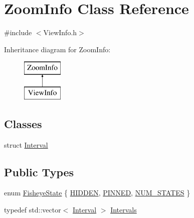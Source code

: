 \hypertarget{class_zoom_info}{}\section{Zoom\+Info Class Reference}
\label{class_zoom_info}


{\ttfamily \#include $<$View\+Info.\+h$>$}

Inheritance diagram for Zoom\+Info\+:\begin{figure}[H]
\begin{center}
\leavevmode
\includegraphics[height=2.000000cm]{class_zoom_info}
\end{center}
\end{figure}
\subsection*{Classes}
\begin{DoxyCompactItemize}
\item 
struct \hyperlink{struct_zoom_info_1_1_interval}{Interval}
\end{DoxyCompactItemize}
\subsection*{Public Types}
\begin{DoxyCompactItemize}
\item 
enum \hyperlink{class_zoom_info_a21e3cd944a2c0241db3c32b2416ba7b6}{Fisheye\+State} \{ \hyperlink{class_zoom_info_a21e3cd944a2c0241db3c32b2416ba7b6aac88e9f498c9306c26caffbeaa349a8e}{H\+I\+D\+D\+EN}, 
\hyperlink{class_zoom_info_a21e3cd944a2c0241db3c32b2416ba7b6a228bf420294e19bf80dcc9320efa2c9b}{P\+I\+N\+N\+ED}, 
\hyperlink{class_zoom_info_a21e3cd944a2c0241db3c32b2416ba7b6ae316d00299b7364f4162fe9f4660c42e}{N\+U\+M\+\_\+\+S\+T\+A\+T\+ES}
 \}
\item 
typedef std\+::vector$<$ \hyperlink{struct_zoom_info_1_1_interval}{Interval} $>$ \hyperlink{class_zoom_info_a68d0856b5e64abd74f91ebeedac395d3}{Intervals}
\end{DoxyCompactItemize}
